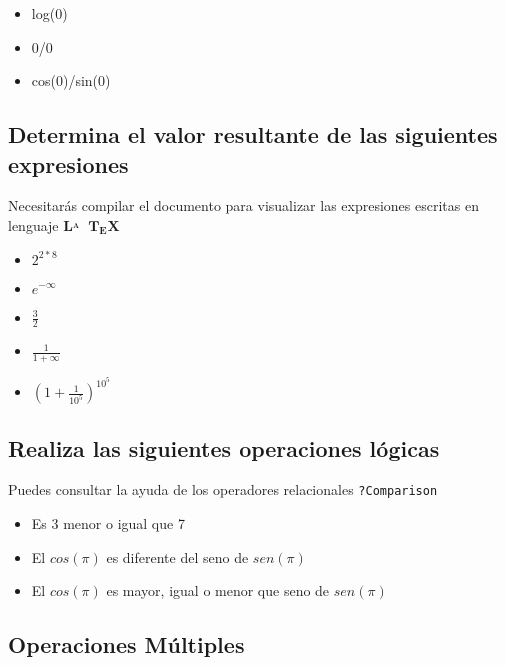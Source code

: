 \documentclass[
]{article}
\providecommand{\tightlist}{%
  \setlength{\itemsep}{0pt}\setlength{\parskip}{0pt}}
\begin{document}
\begin{itemize}
\tightlist
\item
  log(0)
\item
  0/0
\item
  cos(0)/sin(0)
\end{itemize}

\hypertarget{determina-el-valor-resultante-de-las-siguientes-expresiones}{%
\subsection{Determina el valor resultante de las siguientes
expresiones}\label{determina-el-valor-resultante-de-las-siguientes-expresiones}}

Necesitarás compilar el documento para visualizar las expresiones
escritas en lenguaje
\({\displaystyle \mathbf {L\!\!^{{}_{\scriptstyle A}}\!\!\!\!\!\;\;T\!_{\displaystyle E}\!X} }\)

\begin{itemize}
\tightlist
\item
  \(2^{2*8}\)
\item
  \(e^{-\infty}\)
\item
  \(\frac{3}{2}\)
\item
  \(\frac{1}{1+\infty}\)
\item
  \(\left({1+\displaystyle\frac{1}{10^5}}\right)^{10^5}\)
\end{itemize}

\hypertarget{realiza-las-siguientes-operaciones-luxf3gicas}{%
\subsection{Realiza las siguientes operaciones
lógicas}\label{realiza-las-siguientes-operaciones-luxf3gicas}}

Puedes consultar la ayuda de los operadores relacionales
\texttt{?Comparison}

\begin{itemize}
\tightlist
\item
  Es 3 menor o igual que 7
\item
  El \(cos(\pi)\) es diferente del seno de \(sen(\pi)\)
\item
  El \(cos(\pi)\) es mayor, igual o menor que seno de \(sen(\pi)\)
\end{itemize}

\hypertarget{operaciones-muxfaltiples}{%
\subsection{Operaciones Múltiples}\label{operaciones-muxfaltiples}}
\end{document}
